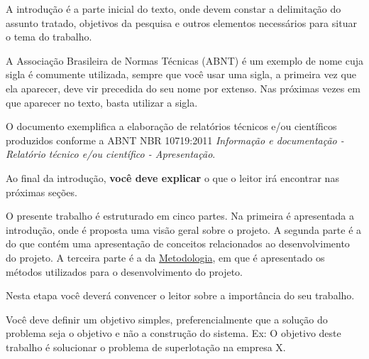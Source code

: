 \tableofcontents*
\cleardoublepage


\textual


A introdução é a parte inicial do texto, onde devem constar a delimitação do assunto tratado, objetivos da pesquisa e outros elementos necessários para situar o tema do trabalho.

A Associação Brasileira de Normas Técnicas (ABNT) é um exemplo de nome cuja sigla é comumente utilizada, sempre que você usar uma sigla, a primeira vez que ela aparecer, deve vir precedida do seu nome por extenso. Nas próximas vezes em que aparecer no texto, basta utilizar a sigla.

O documento exemplifica a elaboração de relatórios técnicos e/ou científicos produzidos conforme a ABNT NBR 10719:2011 \emph{Informação e documentação - Relatório técnico e/ou científico - Apresentação}.


Ao final da introdução, \textbf{você deve explicar} o que o leitor irá encontrar nas próximas seções.

O presente trabalho é estruturado em cinco partes. Na primeira é apresentada a introdução, onde é proposta uma visão geral sobre o projeto. A segunda parte é a do  que contém uma apresentação de conceitos relacionados ao desenvolvimento
do projeto. A terceira parte é a da \hyperref[sec:metodologia]{Metodologia}, em que é apresentado os métodos
utilizados para o desenvolvimento do projeto.


Nesta etapa você deverá convencer o leitor sobre a importância do seu trabalho.


Você deve definir um objetivo simples, preferencialmente que a solução do problema seja o objetivo e não a construção do sistema.
Ex:
O objetivo deste trabalho é solucionar o problema de superlotação na empresa X.

